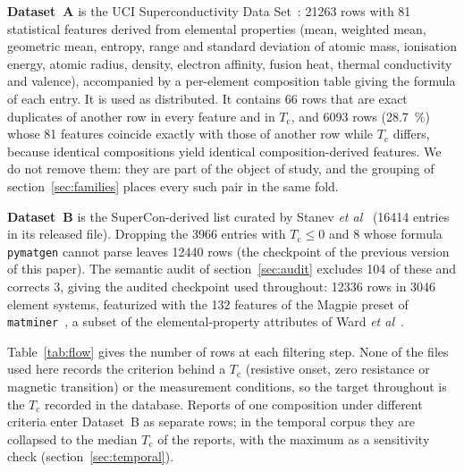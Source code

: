 \documentclass{iopjournal}
\newcommand{\Tc}{T_{\mathrm c}}
\newcommand{\etal}{\textit{et al}}
\begin{document}
\textbf{Dataset~A} is the UCI Superconductivity Data Set~\cite{hamidieh2018}: \num{21263} rows with
\num{81} statistical features derived from elemental properties (mean, weighted mean, geometric
mean, entropy, range and standard deviation of atomic mass, ionisation energy, atomic radius,
density, electron affinity, fusion heat, thermal conductivity and valence), accompanied by a
per-element composition table giving the formula of each entry. It is used as distributed. It
contains \num{66} rows that are exact duplicates of another row in every feature and in $\Tc$, and
\num{6093} rows (\SI{28.7}{\percent}) whose \num{81} features coincide exactly with those of another
row while $\Tc$ differs, because identical compositions yield identical composition-derived
features. We do not remove them: they are part of the object of study, and the grouping of
section~\ref{sec:families} places every such pair in the same fold.

\textbf{Dataset~B} is the SuperCon-derived list curated by Stanev \etal~\cite{stanev2018}
(\num{16414} entries in its released file). Dropping the \num{3966} entries with $\Tc \le 0$ and \num{8} whose formula
\texttt{pymatgen} cannot parse leaves \num{12440} rows (the checkpoint of the previous version of
this paper). The semantic audit of section~\ref{sec:audit} excludes \num{104} of these and corrects
\num{3}, giving the audited checkpoint used throughout: \num{12336} rows in \num{3046} element
systems, featurized with the \num{132} features of the Magpie preset of \texttt{matminer}~\cite{ward2018}, a subset of the
elemental-property attributes of Ward \etal~\cite{ward2016}.

Table~\ref{tab:flow} gives the number of rows at each filtering step. None of the files used here records the criterion behind a $\Tc$ (resistive onset, zero resistance or magnetic transition) or the measurement conditions, so the target throughout is the $\Tc$ recorded in the database. Reports of one composition under different criteria enter Dataset~B as separate rows; in the temporal corpus they are collapsed to the median $\Tc$ of the reports, with the maximum as a sensitivity check (section~\ref{sec:temporal}).
\end{document}
